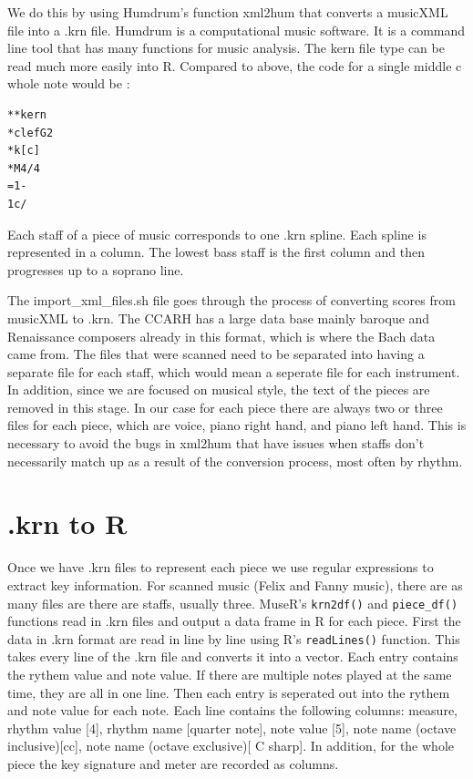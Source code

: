 \documentclass[12pt,twoside]{reedthesis}
\theoremstyle{definition}
\theoremstyle{definition}
\theoremstyle{definition}
\theoremstyle{remark}
\begin{document}
We do this by using Humdrum's function xml2hum that converts a musicXML
file into a .krn file. Humdrum is a computational music software. It is
a command line tool that has many functions for music analysis. The kern
file type can be read much more easily into R. Compared to above, the
code for a single middle c whole note would be :
\begin{verbatim}
**kern
*clefG2
*k[c]
*M4/4
=1-
1c/
\end{verbatim}
Each staff of a piece of music corresponds to one .krn spline. Each
spline is represented in a column. The lowest bass staff is the first
column and then progresses up to a soprano line.

The import\_xml\_files.sh file goes through the process of converting
scores from musicXML to .krn. The CCARH has a large data base mainly
baroque and Renaissance composers already in this format, which is where
the Bach data came from. The files that were scanned need to be
separated into having a separate file for each staff, which would mean a
seperate file for each instrument. In addition, since we are focused on
musical style, the text of the pieces are removed in this stage. In our
case for each piece there are always two or three files for each piece,
which are voice, piano right hand, and piano left hand. This is
necessary to avoid the bugs in xml2hum that have issues when staffs
don't necessarily match up as a result of the conversion process, most
often by rhythm.

\section{.krn to R}\label{krn-to-r}

Once we have .krn files to represent each piece we use regular
expressions to extract key information. For scanned music (Felix and
Fanny music), there are as many files are there are staffs, usually
three. MuseR's \texttt{krn2df()} and \texttt{piece\_df()} functions read
in .krn files and output a data frame in R for each piece. First the
data in .krn format are read in line by line using R's
\texttt{readLines()} function. This takes every line of the .krn file
and converts it into a vector. Each entry contains the rythem value and
note value. If there are multiple notes played at the same time, they
are all in one line. Then each entry is seperated out into the rythem
and note value for each note. Each line contains the following columns:
measure, rhythm value {[}4{]}, rhythm name {[}quarter note{]}, note
value {[}5{]}, note name (octave inclusive){[}cc{]}, note name (octave
exclusive){[} C sharp{]}. In addition, for the whole piece the key
signature and meter are recorded as columns.
\end{document}

